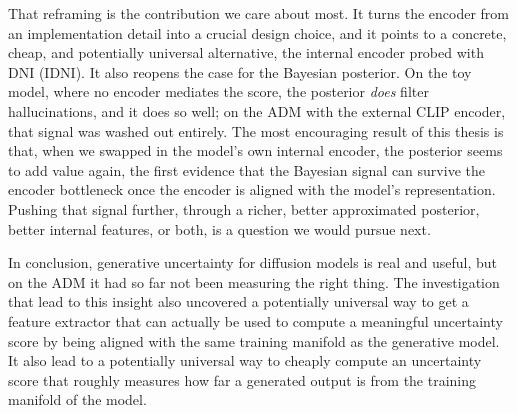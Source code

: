 That reframing is the contribution we care about most. It turns the encoder from an implementation detail into a crucial design choice, and it points to a concrete, cheap, and potentially universal alternative, the internal encoder probed with \acs{DNI} (\acs{IDNI}). It also reopens the case for the Bayesian posterior. On the toy model, where no encoder mediates the score, the posterior \textit{does} filter hallucinations, and it does so well; on the \acs{ADM} with the external \acs{CLIP} encoder, that signal was washed out entirely. The most encouraging result of this thesis is that, when we swapped in the model's own internal encoder, the posterior seems to add value again, the first evidence that the Bayesian signal can survive the encoder bottleneck once the encoder is aligned with the model's representation. Pushing that signal further, through a richer, better approximated posterior, better internal features, or both, is a question we would pursue next.

In conclusion, \cite{jazbec_generative_2025} generative uncertainty for diffusion models is real and useful, but on the \acs{ADM} it had so far not been measuring the right thing. The investigation that lead to this insight also uncovered a potentially universal way to get a feature extractor that can actually be used to compute a meaningful uncertainty score by being aligned with the same training manifold as the generative model. It also lead to a potentially universal way to cheaply compute an uncertainty score that roughly measures how far a generated output is from the training manifold of the model.


